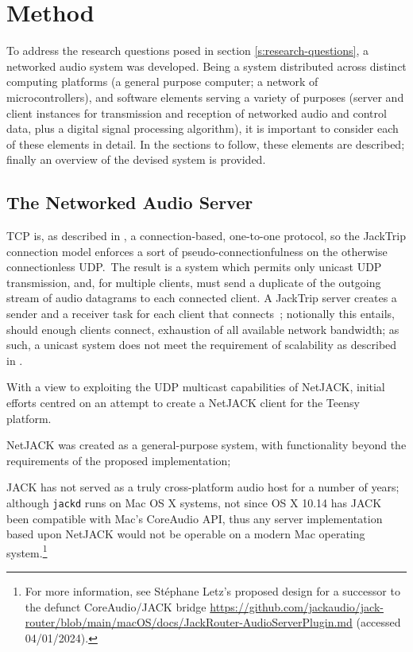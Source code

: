 \section{Method}\label{sec:method}

To address the research questions posed in section \ref{s:research-questions},
a networked audio system was developed.
Being a system distributed across distinct computing platforms (a general
purpose computer; a network of microcontrollers), and software elements
serving a variety of purposes (server and client instances for transmission
and reception of networked audio and control data, plus a digital
signal processing algorithm), it is important to consider each of these
elements in detail.
In the sections to follow, these elements are described;
finally an overview of the devised system is provided.

\subsection{The Networked Audio Server}\label{subsec:the-networked-audio-server}

TCP is, as described in , a
connection-based, one-to-one protocol, so the JackTrip connection model enforces
a sort of pseudo-connectionfulness on the otherwise connectionless UDP.\
The result is a system which permits only unicast UDP transmission, and, for
multiple clients, must send a duplicate of the outgoing stream of audio
datagrams to each connected client.
A JackTrip server creates a sender and a receiver task for each client that
connects~\citep{caceres_jacktrip_2010};
notionally this entails, should enough clients connect, exhaustion of all
available network bandwidth;
as such, a unicast system does not meet the requirement of scalability as
described in \secref{subsec:distributed-computing}.

With a view to exploiting the UDP multicast capabilities of NetJACK, initial
efforts centred on an attempt to create a NetJACK client for the Teensy
platform.
\begin{inparaenum}[1)]
    \item NetJACK was created as a general-purpose system, with functionality
    beyond the requirements of the proposed implementation;
    \item JACK has not served as a truly cross-platform audio host for a
    number of years; although \texttt{jackd} runs on Mac OS X systems, not
    since OS X 10.14 has JACK been compatible with Mac's CoreAudio
    API, thus any server implementation based upon NetJACK would not be
    operable on a modern Mac operating system.\footnote{
        For more information, see Stéphane Letz's proposed design for a
        successor to the defunct CoreAudio/JACK bridge
        \url{https://github.com/jackaudio/jack-router/blob/main/macOS/docs/JackRouter-AudioServerPlugin.md}
        (accessed 04/01/2024).
    }
\end{inparaenum}

